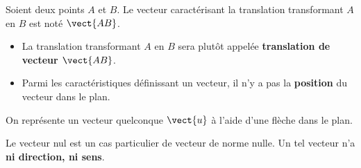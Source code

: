 \documentclass{article}
\begin{document}
\begin{definition}
Soient deux points $A$ et $B$. Le vecteur caractérisant la translation transformant $A$ en $B$ est noté $\vect{AB}$.
\end{definition}
\begin{remark}
\hfill
\begin{itemize}
\item La translation transformant $A$ en $B$ sera plutôt appelée \textbf{translation de vecteur $\vect{AB}$}.
\item Parmi les caractéristiques définissant un vecteur, il n'y a pas la \textbf{position} du vecteur dans le plan.
\end{itemize}
\end{remark}
\begin{example}
On représente un vecteur quelconque $\vect{u}$ à l'aide d'une flèche dans le plan.
\begin{center}
\end{center}
\end{example}
\begin{tcolorbox}
Le vecteur nul est un cas particulier de vecteur de norme nulle. Un tel vecteur n'a \textbf{ni direction, ni sens}.
\end{tcolorbox}
\end{document}

